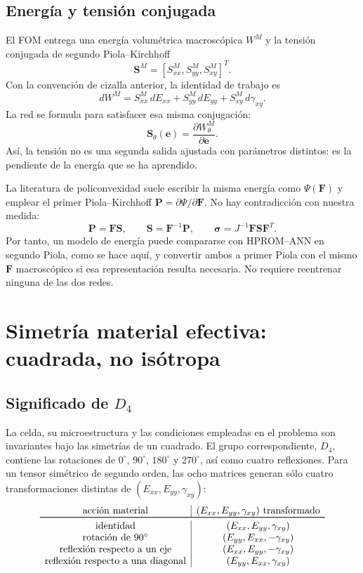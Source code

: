 \documentclass[11pt,a4paper]{article}
\newcommand{\F}{\ensuremath{\bm F}}
\newcommand{\Svec}{\ensuremath{\bm S}}
\newcommand{\evec}{\ensuremath{\bm e}}
\newcommand{\Dfour}{\ensuremath{D_4}}
\newcommand{\W}{\ensuremath{W}}
\newcommand{\FOM}{\textsc{FOM}}
\begin{document}
\subsection{Energía y tensión conjugada}

El \FOM{} entrega una energía volumétrica macroscópica \(\W^M\) y la tensión
conjugada de segundo Piola--Kirchhoff
\[
 \Svec^M=[S_{xx}^M,S_{yy}^M,S_{xy}^M]^T.
\]
Con la convención de cizalla anterior, la identidad de trabajo es
\[
 d\W^M
 =S_{xx}^M\,dE_{xx}
 +S_{yy}^M\,dE_{yy}
 +S_{xy}^M\,d\gamma_{xy}.
 \label{eq:work}
\]
La red se formula para satisfacer esa misma conjugación:
\[
 \boxed{\qquad
 \Svec_\theta(\evec)
 =\frac{\partial\W_\theta^M}{\partial\evec}.
 \qquad}
 \label{eq:stress-gradient}
\]
Así, la tensión no es una segunda salida ajustada con parámetros distintos:
es la pendiente de la energía que se ha aprendido.

La literatura de policonvexidad suele escribir la misma energía como
\(\Psi(\F)\) y emplear el primer Piola--Kirchhoff
\(\bm P=\partial\Psi/\partial\F\). No hay contradicción con nuestra medida:
\[
 \bm P=\F\Svec,
 \qquad \Svec=\F^{-1}\bm P,
 \qquad
 \bm\sigma=J^{-1}\F\Svec\F^T.
 \label{eq:stress_measures}
\]
Por tanto, un modelo de energía puede compararse con HPROM--ANN en segundo
Piola, como se hace aquí, y convertir ambos a primer Piola con el mismo
\(\F\) macroscópico si esa representación resulta necesaria. No requiere
reentrenar ninguna de las dos redes.

\section{Simetría material efectiva: cuadrada, no isótropa}

\subsection{Significado de \texorpdfstring{\(\Dfour\)}{D4}}

La celda, su microestructura y las condiciones empleadas en el problema son
invariantes bajo las simetrías de un cuadrado. El grupo correspondiente,
\(\Dfour\), contiene las rotaciones de \(0^\circ\), \(90^\circ\),
\(180^\circ\) y \(270^\circ\), así como cuatro reflexiones. Para un tensor
simétrico de segundo orden, las ocho matrices generan sólo cuatro
transformaciones distintas de \((E_{xx},E_{yy},\gamma_{xy})\):
\[
\begin{array}{c|c}
\text{acción material} & (E_{xx},E_{yy},\gamma_{xy})\ \text{transformado}\\
\toprule
\text{identidad} & (E_{xx},E_{yy},\gamma_{xy})\\
\text{rotación de }90^\circ & (E_{yy},E_{xx},-\gamma_{xy})\\
\text{reflexión respecto a un eje} & (E_{xx},E_{yy},-\gamma_{xy})\\
\text{reflexión respecto a una diagonal} & (E_{yy},E_{xx},\gamma_{xy})
\end{array}
\label{tab:d4actions}
\]
\end{document}
